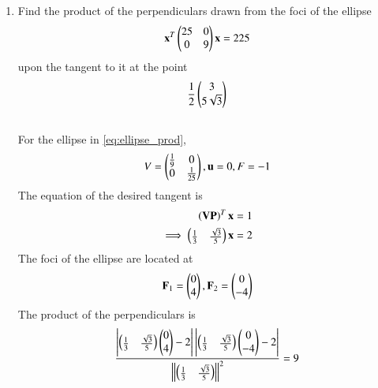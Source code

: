 \documentclass[journal,12pt,twocolumn]{IEEEtran}
\begin{document}
\begin{enumerate}[label=\arabic*]
\item Find the product of the perpendiculars drawn from the foci of the ellipse
\begin{equation}
\label{eq:ellipse_prod}
\mathbf{x}^T\begin{pmatrix}25 & 0 \\ 0 & 9\end{pmatrix}\mathbf{x}  = 225
\end{equation}
upon the tangent to it at the point
\begin{equation}
\frac{1}{2}\begin{pmatrix}3\\ 5 \sqrt{3}\end{pmatrix}
\end{equation}
\\
\solution For the ellipse in \eqref{eq:ellipse_prod},
\begin{align}
\label{eq:ellipse_prod_param}
V = \begin{pmatrix}\frac{1}{9} & 0 \\ 0 & \frac{1}{25}\end{pmatrix}, \mathbf{u} = 0, F=-1
\end{align}
%
The equation of the desired tangent is
\begin{align}
\label{eq:ellipse_prod_tangent}
\left(\mathbf{V}\mathbf{P}\right)^T\mathbf{x}&=1
\\
\implies \begin{pmatrix}\frac{1}{3} & \frac{\sqrt{3}}{5}\end{pmatrix}\mathbf{x}&=2
\end{align}
%
The foci of the ellipse are located at
\begin{align}
\mathbf{F}_1 = \begin{pmatrix}0\\4\end{pmatrix},
\mathbf{F}_2 = \begin{pmatrix}0\\-4\end{pmatrix}
\end{align}
The product of the perpendiculars is
\begin{align}
\frac{\left\vert\begin{pmatrix}\frac{1}{3} & \frac{\sqrt{3}}{5}\end{pmatrix}\begin{pmatrix}0\\4\end{pmatrix}-2\right\vert\left\vert\begin{pmatrix}\frac{1}{3} & \frac{\sqrt{3}}{5}\end{pmatrix}\begin{pmatrix}0\\-4\end{pmatrix}-2\right\vert}{\left\Vert\begin{pmatrix}\frac{1}{3} & \frac{\sqrt{3}}{5}\end{pmatrix}\right\Vert^2}
=9
\end{align}


\end{enumerate}
\end{document}
